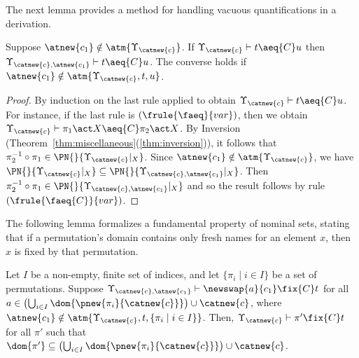 The next lemma provides a method for handling vacuous quantifications in a derivation.

\begin{lemma}\label{alemma:vacuous-quantification}
     Suppose $\atnew{c_1}\notin \atm{\Upsilon_{\catnew{c}}}$. If $\Upsilon_{\catnew{c}} \vdash t\aeq{C} u$ then $\Upsilon_{\catnew{c},\atnew{c_1}}\vdash t\aeq{C} u$. The converse holds if $\atnew{c_1}\notin \atm{\Upsilon_{\catnew{c}},t,u}$.
\end{lemma}

\begin{proof}
 By induction on the last rule applied to obtain $\Upsilon_{\catnew{c}} \vdash t\aeq{C} u$. For instance, if the last rule is $(\frule{\faeq}{var})$, then we obtain $\Upsilon_{\catnew{c}} \vdash \pi_1\act X\aeq{C} \pi_2\act X$. By Inversion (Theorem~\ref{thm:miscellaneous}(\ref{thm:inversion})), it follows that $\pi_2^{-1}\circ\pi_1\in \PN{}{\Upsilon_{\catnew{c}}|_X}$. Since $\atnew{c_1}\notin \atm{\Upsilon_{\catnew{c}}}$, we  have $\PN{}{\Upsilon_{\catnew{c}}|_X}\subseteq\PN{}{\Upsilon_{\catnew{c},\atnew{c_1}}|_X} $. Then $\pi_2^{-1}\circ\pi_1\in \PN{}{\Upsilon_{\catnew{c},\atnew{c_1}}|_X}$ and so the result follows by rule $(\frule{\faeq{C}}{var})$.

\end{proof}

The following lemma formalizes a fundamental property of nominal sets, stating that if a permutation's domain contains only fresh names for an element $x$, then $x$ is fixed by that permutation.

\begin{lemma}\label{alemma:fix-point-formed-by-fresh-names}
    Let $I$ be a non-empty, finite set of indices, and let $\{\pi_i \mid i \in I\}$ be a set of permutations. Suppose $\Upsilon_{\catnew{c}, \atnew{c_1}} \vdash \newswap{a}{c_1}\fix{C} t$ for all $a \in \left(\bigcup_{i \in I} \dom{\pnew{\pi_i}{\catnew{c}}}\right) \cup \catnew{c}$, where $\atnew{c_1} \notin \atm{\Upsilon_{\catnew{c}},t, \{\pi_i \mid i \in I\}}$. Then, $\Upsilon_{\catnew{c}} \vdash \pi'\fix{C} t$ for all $\pi'$ such that $\dom{\pi'} \subseteq \left(\bigcup_{i \in I} \dom{\pnew{\pi_i}{\catnew{c}}}\right) \cup \catnew{c}$.
\end{lemma}


